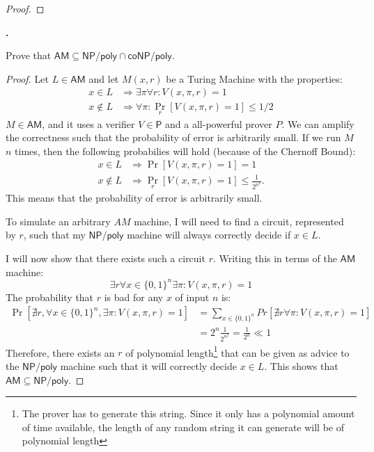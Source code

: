 \documentclass[letterpaper,11pt]{article}
\newcommand{\cc}[1]{\ensuremath{\textsf{#1}}\xspace}
\renewcommand{\P}{\cc{P}}
\newcommand{\NP}{\cc{NP}}
\newcommand{\coNP}{\cc{coNP}}
\newcommand{\AM}{\cc{AM}}
\newcounter{problem}
\newenvironment{problem}%
{%
	\stepcounter{problem}%
	\textbf{\theproblem.}
	\large
}{\\}%
\newcommand{\tm}{Turing Machine}
\newcommand{\NPpoly}{\NP/\textsf{poly}}
\begin{document}
\begin{proof}
\end{proof}


\begin{problem}
Prove that $\AM \subseteq \NP/\textsf{poly} \cap \coNP/\textsf{poly}$. 
\end{problem}

\begin{proof}
Let $L \in \AM$ and let $M(x,r)$ be a \tm{} with the properties:
\begin{align*}
	x \in L &\Rightarrow \exists \pi \forall r : V(x,\pi,r) = 1 \\
	x \not \in L &\Rightarrow \forall \pi  : \underset{r}{\Pr}[V(x,\pi,r) =1] \leq 1/2
\end{align*}
$M \in \AM$, and it uses a verifier $V \in \P$ and a all-powerful prover $P$.
We can amplify the correctness such that the probability of error is arbitrarily small.
If we run $M$ $n$ times, then the following probabilies will hold (because of the Chernoff Bound):
\begin{align*}
	x \in L &\Rightarrow \Pr[V(x,\pi,r) =1] = 1 \\
	x \not \in L &\Rightarrow \underset{r}{\Pr}[V(x,\pi,r) = 1] \leq \frac{1}{2^{n^2}}.
\end{align*}
This means that the probability of error is arbitrarily small.

To simulate an arbitrary $AM$ machine, I will need to find a circuit, represented by $r$, such that my $\NPpoly$ machine will always correctly decide if $x \in L$.

I will now show that there exists such a circuit $r$.
Writing this in terms of the $\AM$ machine:
\[
	\exists r \forall x \in \{0,1\}^n \exists{\pi}: V(x,\pi,r) = 1
\]
The probability that $r$ is bad for any $x$ of input $n$ is:
\begin{align*}
	\Pr[\nexists r, \forall x \in \{0,1\}^n, \exists \pi: V(x,\pi,r) = 1] &= \sum_{x \in \{0,1\}^n} Pr[\nexists r \forall \pi: V(x,\pi,r) = 1] \\
	&= 2^n \frac{1}{2^{n^2}} = \frac{1}{2^n} \ll 1
\end{align*}
Therefore, there exists an $r$ of polynomial length\footnote{The prover has to generate this string. Since it only has a polynomial amount of time available, the length of any random string it can generate will be of polynomial length} that can be given as advice to the $\NPpoly$ machine such that it will correctly decide $x \in L$.
This shows that $\AM \subseteq \NPpoly$.


\end{proof}
\end{document}
